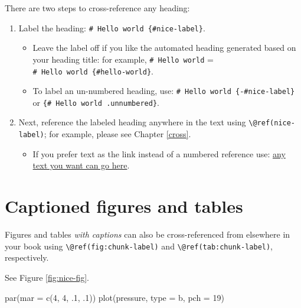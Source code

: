 \documentclass[
  12pt,
]{book}
\newenvironment{Shaded}{\begin{snugshade}}{\end{snugshade}}
\newcommand{\AttributeTok}[1]{\textcolor[rgb]{0.77,0.63,0.00}{#1}}
\newcommand{\DecValTok}[1]{\textcolor[rgb]{0.00,0.00,0.81}{#1}}
\newcommand{\FunctionTok}[1]{\textcolor[rgb]{0.00,0.00,0.00}{#1}}
\newcommand{\NormalTok}[1]{#1}
\newcommand{\StringTok}[1]{\textcolor[rgb]{0.31,0.60,0.02}{#1}}
\providecommand{\tightlist}{%
  \setlength{\itemsep}{0pt}\setlength{\parskip}{0pt}}
\theoremstyle{definition}
\theoremstyle{definition}
\theoremstyle{definition}
\theoremstyle{definition}
\theoremstyle{remark}
\begin{document}
There are two steps to cross-reference any heading:

\begin{enumerate}
\def\labelenumi{\arabic{enumi}.}
\tightlist
\item
  Label the heading: \texttt{\#\ Hello\ world\ \{\#nice-label\}}.

  \begin{itemize}
  \tightlist
  \item
    Leave the label off if you like the automated heading generated based on your heading title: for example, \texttt{\#\ Hello\ world} = \texttt{\#\ Hello\ world\ \{\#hello-world\}}.
  \item
    To label an un-numbered heading, use: \texttt{\#\ Hello\ world\ \{-\#nice-label\}} or \texttt{\{\#\ Hello\ world\ .unnumbered\}}.
  \end{itemize}
\item
  Next, reference the labeled heading anywhere in the text using \texttt{\textbackslash{}@ref(nice-label)}; for example, please see Chapter \ref{cross}.

  \begin{itemize}
  \tightlist
  \item
    If you prefer text as the link instead of a numbered reference use: \protect\hyperlink{cross}{any text you want can go here}.
  \end{itemize}
\end{enumerate}

\hypertarget{captioned-figures-and-tables}{%
\section{Captioned figures and tables}\label{captioned-figures-and-tables}}

Figures and tables \emph{with captions} can also be cross-referenced from elsewhere in your book using \texttt{\textbackslash{}@ref(fig:chunk-label)} and \texttt{\textbackslash{}@ref(tab:chunk-label)}, respectively.

See Figure \ref{fig:nice-fig}.

\begin{Shaded}
\begin{Highlighting}[]
\FunctionTok{par}\NormalTok{(}\AttributeTok{mar =} \FunctionTok{c}\NormalTok{(}\DecValTok{4}\NormalTok{, }\DecValTok{4}\NormalTok{, .}\DecValTok{1}\NormalTok{, .}\DecValTok{1}\NormalTok{))}
\FunctionTok{plot}\NormalTok{(pressure, }\AttributeTok{type =} \StringTok{\textquotesingle{}b\textquotesingle{}}\NormalTok{, }\AttributeTok{pch =} \DecValTok{19}\NormalTok{)}
\end{Highlighting}
\end{Shaded}
\end{document}
